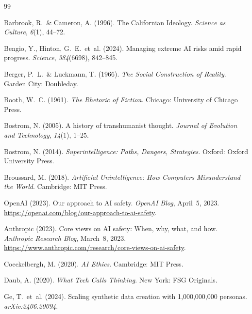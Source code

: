 \documentclass[12pt,a4paper]{article}
\begin{document}
\begin{thebibliography}{99}

  Barbrook, R.~\& Cameron, A. (1996).
  The Californian Ideology.
  \textit{Science as Culture}, \textit{6}(1), 44--72.

  Bengio, Y., Hinton, G.~E.~et~al. (2024).
  Managing extreme AI risks amid rapid progress.
  \textit{Science}, \textit{384}(6698), 842--845.

  Berger, P.~L.~\& Luckmann, T. (1966).
  \textit{The Social Construction of Reality}.
  Garden City: Doubleday.

  Booth, W.~C. (1961).
  \textit{The Rhetoric of Fiction}.
  Chicago: University of Chicago Press.

  Bostrom, N. (2005).
  A history of transhumanist thought.
  \textit{Journal of Evolution and Technology}, \textit{14}(1), 1--25.

  Bostrom, N. (2014).
  \textit{Superintelligence: Paths, Dangers, Strategies}.
  Oxford: Oxford University Press.

  Broussard, M. (2018).
  \textit{Artificial Unintelligence: How Computers Misunderstand the World}.
  Cambridge: MIT Press.

  OpenAI (2023).
  Our approach to AI safety.
  \textit{OpenAI Blog}, April~5, 2023.
  \url{https://openai.com/blog/our-approach-to-ai-safety}.

  Anthropic (2023).
  Core views on AI safety: When, why, what, and how.
  \textit{Anthropic Research Blog}, March~8, 2023.
  \url{https://www.anthropic.com/research/core-views-on-ai-safety}.

  Coeckelbergh, M. (2020).
  \textit{AI Ethics}.
  Cambridge: MIT Press.

  Daub, A. (2020).
  \textit{What Tech Calls Thinking}.
  New York: FSG Originals.

  Ge, T.~et~al. (2024).
  Scaling synthetic data creation with 1{,}000{,}000{,}000 personas.
  \textit{arXiv:2406.20094}.



\end{thebibliography}
\end{document}
